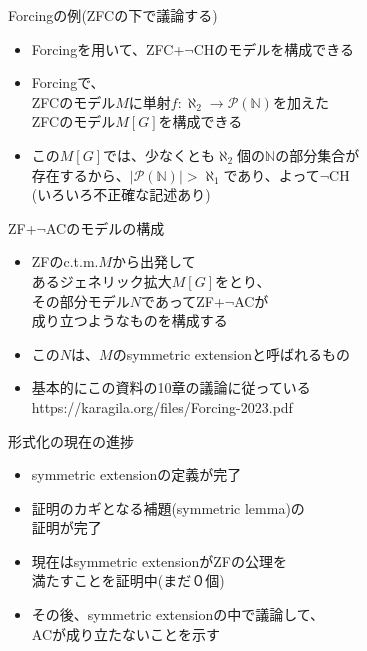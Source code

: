 \documentclass[17pt,aspectratio=169,xcolor=dvipsnames,table,dvipdfmx]{beamer}
\theoremstyle{definition}
\begin{document}
\begin{frame} {Forcingの例{\small (ZFCの下で議論する)}}
    \begin{itemize}
        \item Forcingを用いて、ZFC+$\neg$CHのモデルを構成できる
        \item Forcingで、\\
              ZFCのモデル$M$に単射$f : \aleph_2 \rightarrow \mathcal{P}(\mathbb{N})$を加えた\\
              ZFCのモデル$M[G]$を構成できる \\
        \item この$M[G]$では、少なくとも$\aleph_2$個の$\mathbb{N}$の部分集合が\\
              存在するから、$|\mathcal{P}(\mathbb{N})| > \aleph_1$であり、よって$\neg$CH \\
              {\footnotesize (いろいろ不正確な記述あり)}
    \end{itemize}
\end{frame}

\begin{frame} {ZF+$\neg$ACのモデルの構成}
    \begin{itemize}
        \item ZFのc.t.m.$M$から出発して\\
              あるジェネリック拡大$M[G]$をとり、\\
              その部分モデル$N$であってZF+$\neg$ACが\\
              成り立つようなものを構成する
        \item この$N$は、$M$のsymmetric extensionと呼ばれるもの
        \item 基本的にこの資料の10章の議論に従っている \\
              https://karagila.org/files/Forcing-2023.pdf
    \end{itemize}
\end{frame}

\begin{frame} {形式化の現在の進捗}
    \begin{itemize}
        \item symmetric extensionの定義が完了
        \item 証明のカギとなる補題(symmetric lemma)の\\証明が完了
        \item 現在はsymmetric extensionがZFの公理を\\満たすことを証明中{\small (まだ０個)}
        \item その後、symmetric extensionの中で議論して、\\ACが成り立たないことを示す
    \end{itemize}
\end{frame}
\end{document}
